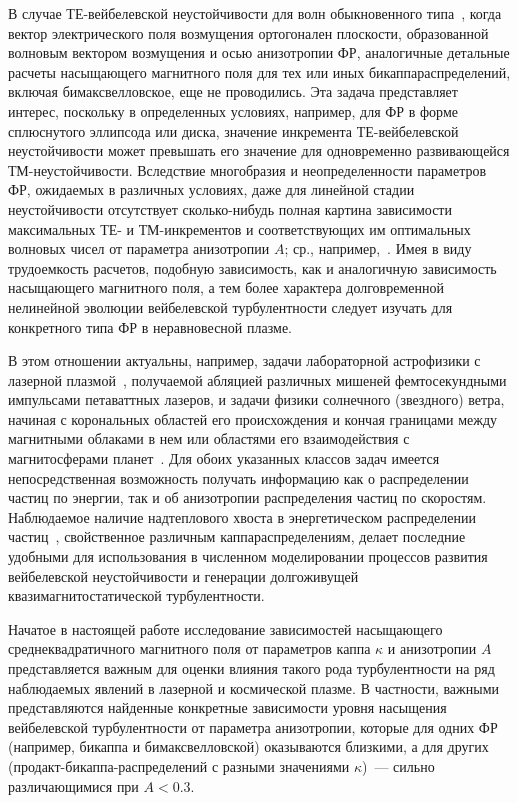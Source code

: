 В случае ТЕ-вейбелевской неустойчивости для волн обыкновенного типа~\cite{Mikhailovsky1971, Gary1993, Vagin2014, Kocharovsky2016, Rubab2016}, когда вектор электрического поля возмущения ортогонален плоскости, образованной волновым вектором возмущения и осью анизотропии ФР, аналогичные детальные расчеты насыщающего магнитного поля для тех или иных бикаппа{\PunctumKappa}распределений, включая бимаксвелловское, еще не проводились. Эта задача представляет интерес, поскольку в определенных условиях, например, для ФР в форме сплюснутого эллипсода или диска, значение инкремента ТЕ-вейбелевской неустойчивости может превышать его значение для одновременно развивающейся ТМ-неустойчивости. Вследствие многобразия и неопределенности параметров ФР, ожидаемых в различных условиях, даже для линейной стадии неустойчивости отсутствует сколько-нибудь полная картина зависимости максимальных ТЕ- и ТМ-инкрементов и соответствующих им оптимальных волновых чисел от параметра анизотропии $A$; ср., например,~\cite{Lazar2010, Zaheer2007, Rubab2016, YOON2011, Silva2021}. Имея в виду трудоемкость расчетов, подобную зависимость, как и аналогичную зависимость насыщающего магнитного поля, а тем более характера долговременной нелинейной эволюции вейбелевской турбулентности следует изучать для конкретного типа ФР в неравновесной плазме.

В этом отношении актуальны, например, задачи лабораторной астрофизики с лазерной плазмой~\cite{Romanov2004, Thaury2010, Silva2020, Shukla2020, Zhang2020}, получаемой абляцией различных мишеней фемтосекундными импульсами петаваттных лазеров, и задачи физики солнечного (звездного) ветра, начиная с корональных областей его происхождения и кончая границами между магнитными облаками в нем или областями его взаимодействия с магнитосферами планет~\cite{Baumjohann2012, Dudik2017, Livadiotis2017,Marsch2006,Yoon2017,Echim2010}. Для обоих указанных классов задач имеется непосредственная возможность получать информацию как о распределении частиц по энергии, так и об анизотропии распределения частиц по скоростям. Наблюдаемое наличие надтеплового {\glqq}хвоста{\grqq} в энергетическом распределении частиц~\cite{Maksimovic2005, Vasyliunas1968,Lazar2022}, свойственное различным каппа{\PunctumKappa}распределениям, делает последние удобными для использования в численном моделировании процессов развития вейбелевской неустойчивости и генерации долгоживущей квазимагнитостатической турбулентности. 

Начатое в настоящей работе исследование зависимостей насыщающего среднеквадратичного магнитного поля от параметров каппа $\kappa$ и анизотропии $A$ представляется важным для оценки влияния такого рода турбулентности на ряд наблюдаемых явлений в лазерной и космической плазме. В частности, важными представляются найденные конкретные зависимости уровня насыщения вейбелевской турбулентности от параметра анизотропии, которые для одних ФР (например, бикаппа{\PunctumKappa} и бимаксвелловской) оказываются близкими, а для других (продакт-бикаппа-распределений с разными значениями $\kappa$)~--- сильно различающимися при $A < 0.3$.

